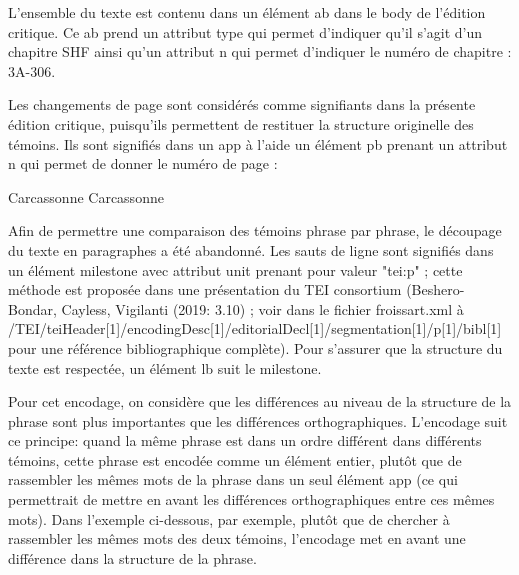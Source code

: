 \documentclass[12pt, a4paper]{article}
\begin{document}
                     L'ensemble du texte est contenu dans un élément ab dans le body de l'édition critique. Ce ab prend un attribut type qui permet d'indiquer
                        qu'il s'agit d'un chapitre SHF ainsi qu'un attribut n qui permet d'indiquer le numéro de chapitre : 3A-306.
                        
                           
                              
                                 
                              
                           
                        
                     Les changements de page sont considérés comme signifiants dans la présente édition critique, puisqu'ils permettent de restituer la structure originelle des témoins.
                        Ils sont signifiés dans un app à l'aide un élément pb prenant un attribut n qui permet de donner le numéro de page :
                        
                           
                              Carcassonne
                              Carcassonne
                           
                        
                     Afin de permettre une comparaison des témoins phrase par phrase, le découpage du texte en paragraphes a été abandonné. Les sauts de ligne sont signifiés dans un élément
                        milestone avec attribut unit prenant pour valeur "tei:p" ; cette méthode est proposée dans une présentation du TEI consortium
                        (Beshero-Bondar, Cayless, Vigilanti (2019: 3.10) ; voir dans le fichier froissart.xml à /TEI/teiHeader[1]/encodingDesc[1]/editorialDecl[1]/segmentation[1]/p[1]/bibl[1]
                        pour une référence bibliographique complète). Pour s'assurer que la structure du texte est respectée, un élément lb suit le milestone.
                        
                           
                              
                                 
                                 
                              
                           
                        
                     Pour cet encodage, on considère que les différences au niveau de la structure de la phrase sont plus importantes que les différences orthographiques. L'encodage suit ce principe:
                        quand la même phrase est dans un ordre différent dans différents témoins, cette phrase est encodée comme un élément entier, plutôt que de rassembler les mêmes mots de la phrase 
                        dans un seul élément app (ce qui permettrait de mettre en avant les différences orthographiques entre ces mêmes mots). Dans l'exemple ci-dessous, par exemple, plutôt que
                        de chercher à rassembler les mêmes mots des deux témoins, l'encodage met en avant une différence dans la structure de la phrase.
                        
\end{document}
